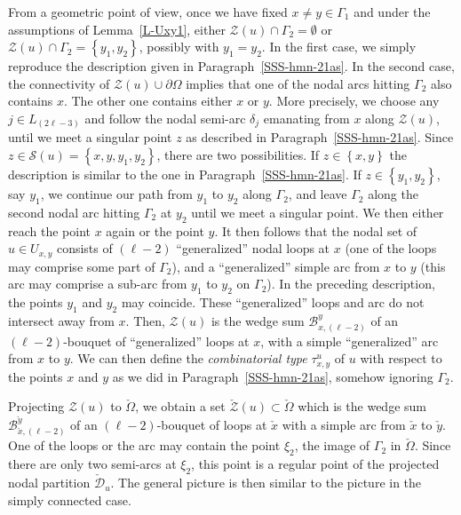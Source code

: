 \documentclass[12pt,a4paper]{amsart}
\theoremstyle{plain} %
\theoremstyle{definition}
\numberwithin{equation}{section}
\numberwithin{figure}{section}
\numberwithin{table}{section}
\newcommand{\cB}{\mathcal{B}}
\newcommand{\cD}{\mathcal{D}}
\newcommand{\cS}{\mathcal{S}}
\newcommand{\cZ}{\mathcal{Z}}
\newcommand{\set}[1]{\left\lbrace #1 \right\rbrace}
\begin{document}
{From a geometric point of view, once we have fixed $x \not = y \in \Gamma_1$ and under the assumptions of Lemma~\ref{L-Uxy1},  either $\cZ(u) \cap \Gamma_2 = \emptyset$ or $\cZ(u) \cap \Gamma_2 = \set{y_1,y_2}$, possibly with $y_1=y_2$.  In the first case, we simply reproduce the description given in Paragraph~\ref{SSS-hmn-21as}. In the second case, the connectivity of $\cZ(u) \cup \partial \Omega$ implies that one of the nodal arcs hitting $\Gamma_2$ also contains $x$.  The other one contains either $x$ or $y$. More precisely, we choose any $j \in L_{(2\ell - 3)}$ and follow the nodal semi-arc $\delta_j$ emanating from $x$ along $\cZ(u)$, until we meet a singular point $z$ as described in Paragraph~\ref{SSS-hmn-21as}. Since $z \in \cS(u) = \set{x,y,y_1,y_2}$, there are two possibilities. If $z \in \set{x,y}$ the description is similar to the one in Paragraph~\ref{SSS-hmn-21as}. If $z \in \set{y_1,y_2}$, say $y_1$, we continue our path from $y_1$ to $y_2$ along $\Gamma_2$, and leave $\Gamma_2$ along the second nodal arc hitting $\Gamma_2$ at $y_2$ until we meet a singular point. We then either reach the point $x$ again or the point $y$. It then follows that the nodal set of $u \in U_{x,y}$ consists of $ (\ell - 2)$ ``generalized'' nodal loops at $x$ (one of the loops may comprise some part of $\Gamma_2$), and a ``generalized'' simple arc from $x$ to $y$ (this arc may comprise a sub-arc from $y_1$ to $y_2$ on $\Gamma_2$).  In the preceding description, the points $y_1$ and $y_2$ may coincide. These ``generalized'' loops and arc do not intersect away from $x$. Then, $\cZ(u)$ is the wedge sum $\cB^{y}_{x,(\ell-2)}$ of an $(\ell - 2)$-bouquet of ``generalized'' loops at $x$, with a simple ``generalized'' arc from $x$ to $y$. We can then define the \emph{combinatorial type} $\tau_{x,y}^{u}$ of $u$ with respect to the points $x$ and $y$ as we did in Paragraph~\ref{SSS-hmn-21as}, somehow ignoring $\Gamma_2$.\smallskip

Projecting $\cZ(u)$ to $\check{\Omega}$, we obtain a set $\check{\cZ}(u) \subset \check{\Omega}$ which is the wedge sum $\cB_{\check{x}, (\ell-2)}^{\check{y}}$ of an $(\ell-2)$-bouquet of loops at $\check{x}$ with a simple arc from $\check{x}$ to $\check{y}$. One of the loops or the arc may contain the point $\xi_2$, the image of $\Gamma_2$ in $\check{\Omega}$.   Since there are only two semi-arcs at $\xi_2$, this point is a regular point of the projected nodal partition $\check{\cD}_{u}$. The general  picture is then similar to the picture in the simply connected case.


}
\end{document}
